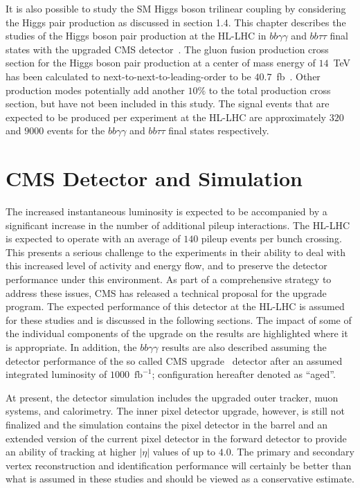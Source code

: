 It is also possible to study the SM Higgs boson trilinear coupling by considering the Higgs pair production as discussed in section 1.4. This chapter describes the studies of the Higgs boson pair production at the HL-LHC in $bb\gamma\gamma$ and $bb\tau\tau$ final states with the upgraded CMS detector~\cite{CMS-PAS-FTR-15-002}. The gluon fusion production cross section for the Higgs boson pair production at a center of mass energy of $14$~TeV has been calculated to next-to-next-to-leading-order to be $40.7$~fb~\cite{Dawson:1998py,Grigo:2014jma}. Other production modes potentially add another $10\%$ to the total production cross section, but have not been included in this study. The signal events that are expected to be produced per experiment at the HL-LHC are approximately $320$ and  $9000$ events for the $bb\gamma\gamma$ and $bb\tau\tau$ final states respectively.

\section{CMS \phasetwo Detector and Simulation}

The increased instantaneous luminosity is expected to be accompanied by a significant increase in the number of additional pileup interactions. The HL-LHC is expected to operate with an average of $140$ pileup events per bunch crossing. This presents a serious challenge to the experiments in their ability to deal with this increased level of activity and energy flow, and to preserve the detector performance under this environment.  As part of a comprehensive strategy to address these issues, CMS has released a technical proposal for the \phasetwo upgrade~\cite{Butler:2020886} program. The expected performance of this detector at the HL-LHC is assumed for these studies and is discussed in the following sections. The impact of some of the individual components of the \phasetwo upgrade on the results are highlighted where it is appropriate. In addition, the $bb\gamma\gamma$ results are also described assuming the detector performance of the so called \phaseone CMS upgrade~\cite{Collaboration:1355706} detector after an assumed integrated luminosity of $1000$~$\mathrm{fb}^{-1}$; configuration hereafter denoted as ``\phaseone aged''.

At present, the \phasetwo detector simulation includes the upgraded outer tracker, muon systems, and calorimetry. The inner pixel detector upgrade, however, is still not finalized and the simulation contains the \phaseone pixel detector in the barrel and an extended version of the current pixel detector in the forward detector to provide an ability of tracking at higher $|\eta|$ values of up to $4.0$. The primary and secondary vertex reconstruction and identification performance will certainly be better than what is assumed in these studies and should be viewed as a conservative estimate.

